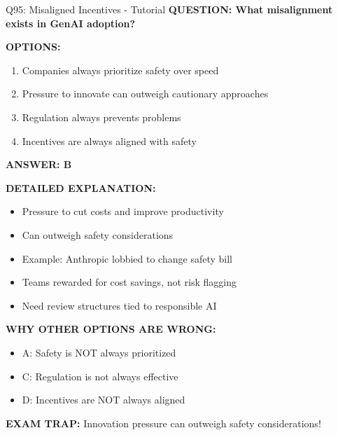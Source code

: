 \documentclass[8pt]{beamer}
\begin{document}
	\begin{frame}{Q95: Misaligned Incentives - Tutorial}
		\fontsize{6.5}{7.5}\selectfont
		\textbf{QUESTION: What misalignment exists in GenAI adoption?}
		
		\vspace{0.1cm}
		\textbf{OPTIONS:}
		\begin{enumerate}
			\item Companies always prioritize safety over speed
			\item Pressure to innovate can outweigh cautionary approaches
			\item Regulation always prevents problems
			\item Incentives are always aligned with safety
		\end{enumerate}
		
		\vspace{0.1cm}
		\textcolor{myblue}{\textbf{ANSWER: B}}
		
		\vspace{0.1cm}
		\textbf{DETAILED EXPLANATION:}
		\begin{itemize}
			\item Pressure to cut costs and improve productivity
			\item Can outweigh safety considerations
			\item Example: Anthropic lobbied to change safety bill
			\item Teams rewarded for cost savings, not risk flagging
			\item Need review structures tied to responsible AI
		\end{itemize}
		
		\vspace{0.1cm}
		\textcolor{myred}{\textbf{WHY OTHER OPTIONS ARE WRONG:}}
		\begin{itemize}
			\item \textcolor{myred}{A:} Safety is NOT always prioritized
			\item \textcolor{myred}{C:} Regulation is not always effective
			\item \textcolor{myred}{D:} Incentives are NOT always aligned
		\end{itemize}
		
		\textcolor{myred}{\textbf{EXAM TRAP:}} Innovation pressure can \textcolor{myblue}{outweigh safety considerations}!
	\end{frame}
	
\end{document}
